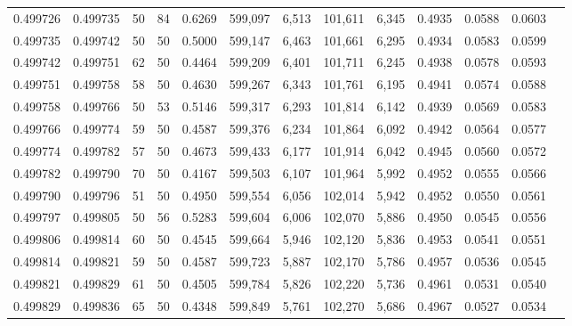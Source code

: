 \begin{tabular}{rrrrrrrrrrrrr}
0.499726 & 0.499735 &    50 &  84 &                                     0.6269 & 599,097 &   6,513 & 101,611 &   6,345 & 0.4935 & 0.0588 & 0.0603 \\
0.499735 & 0.499742 &    50 &  50 &                                     0.5000 & 599,147 &   6,463 & 101,661 &   6,295 & 0.4934 & 0.0583 & 0.0599 \\
0.499742 & 0.499751 &    62 &  50 &                                     0.4464 & 599,209 &   6,401 & 101,711 &   6,245 & 0.4938 & 0.0578 & 0.0593 \\
0.499751 & 0.499758 &    58 &  50 &                                     0.4630 & 599,267 &   6,343 & 101,761 &   6,195 & 0.4941 & 0.0574 & 0.0588 \\
0.499758 & 0.499766 &    50 &  53 &                                     0.5146 & 599,317 &   6,293 & 101,814 &   6,142 & 0.4939 & 0.0569 & 0.0583 \\
0.499766 & 0.499774 &    59 &  50 &                                     0.4587 & 599,376 &   6,234 & 101,864 &   6,092 & 0.4942 & 0.0564 & 0.0577 \\
0.499774 & 0.499782 &    57 &  50 &                                     0.4673 & 599,433 &   6,177 & 101,914 &   6,042 & 0.4945 & 0.0560 & 0.0572 \\
0.499782 & 0.499790 &    70 &  50 &                                     0.4167 & 599,503 &   6,107 & 101,964 &   5,992 & 0.4952 & 0.0555 & 0.0566 \\
0.499790 & 0.499796 &    51 &  50 &                                     0.4950 & 599,554 &   6,056 & 102,014 &   5,942 & 0.4952 & 0.0550 & 0.0561 \\
0.499797 & 0.499805 &    50 &  56 &                                     0.5283 & 599,604 &   6,006 & 102,070 &   5,886 & 0.4950 & 0.0545 & 0.0556 \\
0.499806 & 0.499814 &    60 &  50 &                                     0.4545 & 599,664 &   5,946 & 102,120 &   5,836 & 0.4953 & 0.0541 & 0.0551 \\
0.499814 & 0.499821 &    59 &  50 &                                     0.4587 & 599,723 &   5,887 & 102,170 &   5,786 & 0.4957 & 0.0536 & 0.0545 \\
0.499821 & 0.499829 &    61 &  50 &                                     0.4505 & 599,784 &   5,826 & 102,220 &   5,736 & 0.4961 & 0.0531 & 0.0540 \\
0.499829 & 0.499836 &    65 &  50 &                                     0.4348 & 599,849 &   5,761 & 102,270 &   5,686 & 0.4967 & 0.0527 & 0.0534 \\

\end{tabular}
